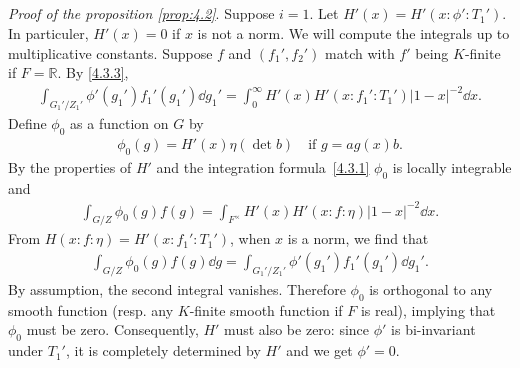 \subsection{}
\emph{Proof of the proposition \ref{prop:4.2}}.
Suppose $i = 1$.
Let $H'(x) = H'(x:\phi':T_1')$.
In particuler, $H'(x) = 0$ if $x$ is not a norm.
We will compute the integrals up to multiplicative constants.
Suppose $f$ and $(f_1', f_2')$ match with $f'$ being $K$-finite if $F = \mathbb{R}$.
By \eqref{4.3.3},
\begin{align*}
    \int_{G_1' / Z_1'} \phi'(g_1') f_1'(g_1') \dd g_1' = \int_{0}^{\infty} H'(x) H'(x:f_1':T_1') |1 - x|^{-2} \dd x.
\end{align*}
Define $\phi_0$ as a function on $G$ by
\begin{align*}
    \phi_0(g) = H'(x) \eta(\det b) \quad \text{if } g = ag(x) b.
\end{align*}
By the properties of $H'$ and the integration formula~\eqref{4.3.1} $\phi_0$ is locally integrable and
\begin{align*}
    \int_{G/Z} \phi_0(g) f(g) = \int_{F^\times} H'(x) H'(x:f:\eta) |1 - x|^{-2} \dd x.
\end{align*}
From $H(x:f:\eta) = H'(x:f_1':T_1')$, when $x$ is a norm, we find that
\begin{align*}
    \int_{G/Z} \phi_0(g) f(g) \dd g = \int_{G_1' / Z_1'} \phi'(g_1') f_1'(g_1') \dd g_1'.
\end{align*}
By assumption, the second integral vanishes.
Therefore $\phi_0$ is orthogonal to any smooth function (resp. any $K$-finite smooth function if $F$ is real), implying that $\phi_0$ must be zero.
Consequently, $H'$ must also be zero: since $\phi'$ is bi-invariant under $T_1'$, it is completely determined by $H'$ and we get $\phi' = 0$.
